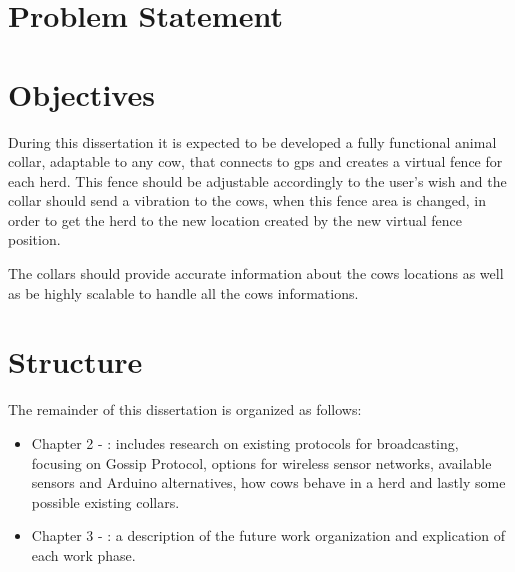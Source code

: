 \section{Problem Statement}
\label{sec:problem_statement}

\section{Objectives}
\label{sec:objectives}
During this dissertation it is expected to be developed a fully
functional animal collar, adaptable to any cow, that connects to gps and creates a
virtual fence for each herd. This fence should be adjustable accordingly to the
user's wish and the collar should send a vibration to the cows, when this fence
area is changed, in order to get the herd to the new location created by the new
virtual fence position.

The collars should provide accurate information about the cows locations as well
as be highly scalable to handle all the cows informations.

\section{Structure}
\label{sec:structure}
The remainder of this dissertation is organized as follows:
\begin{itemize}
      \item Chapter 2 - : includes research on existing
            protocols for broadcasting, focusing on Gossip Protocol, options for wireless
            sensor networks, available sensors and Arduino alternatives, how cows behave
            in a herd and lastly some possible existing collars.
      \item Chapter 3 - : a description of the future work
            organization and explication of each work phase.
\end{itemize}
